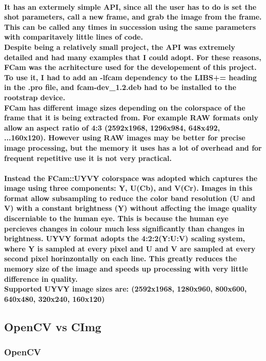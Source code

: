 \documentclass[11pt]{article} %
\begin{document}
\paragraph{It has an extermely simple API, since all the user has to do is set the shot parameters, call a new frame, and grab the image from the frame. This can be called any times in succession using the same parameters with comparitavely little lines of code.\\
Despite being a relatively small project, the API was extremely detailed and had many examples that I could adopt. For these reasons, FCam was the acrhitecture used for the developement of this project.
\\
To use it, I had to add an -lfcam dependency to the LIBS+= heading in the .pro file, and fcam-dev\_1.2.deb had to be installed to the rootstrap device.
\\
FCam has different image sizes depending on the colorspace of the frame that it is being extracted from. For example RAW formats only allow an aspect ratio of 4:3 (2592x1968, 1296x984, 648x492, ...160x120). However using RAW images may be better for precise image processing, but the memory it uses has a lot of overhead and for frequent repetitive use it is not very practical.}
\paragraph{Instead the FCam::UYVY colorspace was adopted which captures the image using three components: Y, U(Cb), and V(Cr). 
Images in this format allow subsampling to reduce the color band resolution (U and V) with a constant brightness (Y) without affecting the image quality discerniable to the human eye. This is because the human eye percieves changes in colour much less significantly than changes in brightness. UYVY format adopts the 4:2:2(Y:U:V) scaling system, where Y is sampled at every pixel and U and V are sampled at every second pixel horinzontally on each line. This greatly reduces the memory size of the image and speeds up processing with very little difference in quality.\\
Supported UYVY image sizes are: (2592x1968, 1280x960, 800x600, 640x480, 320x240, 160x120)}

\subsection{OpenCV vs CImg}
\subsubsection{OpenCV}
\end{document}
